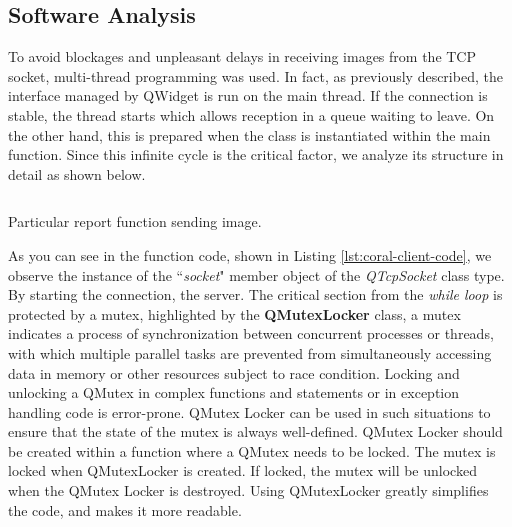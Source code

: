 \subsection{Software Analysis}
\label{ssec:software-coral-analysis}
To avoid blockages and unpleasant delays in receiving images from the TCP
socket, multi-thread programming was used. In fact, as previously described, the
interface managed by QWidget is run on the main thread. If the connection is
stable, the thread starts which allows reception in a queue waiting to leave. 
On the other hand, this is prepared when the class is instantiated within the
main function. Since this infinite cycle is the critical factor, we analyze its
structure in detail as shown below.
%
\begin{listing}[ht] 
\inputminted[bgcolor=bg,frame=lines,framesep=2mm, linenos=true, autogobble, breaklines=true, fontsize=\scriptsize]{c++}{software/code/streamerthread.cpp} 
\caption{Particular report function sending image.} 
\label{lst:coral-client-code} 
\end{listing}
%
As you can see in the function code, shown in Listing
\ref{lst:coral-client-code}, we observe the instance of the ``\emph{socket}"
member object of the \emph{QTcpSocket} class type. By starting the connection, the
server. The critical section from the \emph{while loop} is protected by a mutex,
highlighted by the \textbf{QMutexLocker} class, a mutex indicates a process of
synchronization between concurrent processes or threads, with which multiple
parallel tasks are prevented from simultaneously accessing data in memory or
other resources subject to race condition.\cite{wiki:mutex} 
Locking and unlocking a QMutex in complex functions and statements or in
exception handling code is error-prone. 
QMutex Locker can be used in such situations to ensure that the state of the
mutex is always well-defined. QMutex Locker should be created within a function
where a QMutex needs to be locked. The mutex is locked when QMutexLocker is
created. If locked, the mutex will be unlocked when the QMutex Locker is
destroyed.
Using QMutexLocker greatly simplifies the code, and makes it more
readable.\cite{Qt:QMutexclass}
